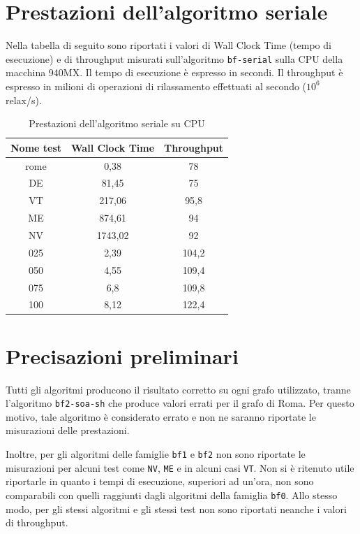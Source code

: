 \documentclass[12pt,a4paper]{book} %
\begin{document}
	\section{Prestazioni dell'algoritmo seriale}
	Nella tabella di seguito sono riportati i valori di Wall Clock Time (tempo di esecuzione) e di throughput misurati sull'algoritmo \texttt{bf-serial} sulla CPU della macchina 940MX. Il tempo di esecuzione è espresso in secondi. Il throughput è espresso in milioni di operazioni di rilassamento effettuati al secondo ($10^6$ relax/s).
	
	\begin{table}[!ht]
		\centering
		\begin{tabular}{|c|c|c|}
			\hline
			\textbf{Nome test} & \textbf{Wall Clock Time} & \textbf{Throughput} \\ \hline
			       rome & 0,38 & 78 \\ \hline
			        DE & 81,45 & 75 \\ \hline
			        VT & 217,06 & 95,8 \\ \hline
			        ME & 874,61 & 94 \\ \hline
			        NV & 1743,02 & 92 \\ \hline
			        025 & 2,39 & 104,2 \\ \hline
			        050 & 4,55 & 109,4 \\ \hline
			        075 & 6,8 & 109,8 \\ \hline
			        100 & 8,12 & 122,4 \\ \hline
		\end{tabular}
		\label{tab:performance_serial}
		\caption{Prestazioni dell'algoritmo seriale su CPU}
	\end{table}

	\section{Precisazioni preliminari}
	Tutti gli algoritmi producono il risultato corretto su ogni grafo utilizzato, tranne l'algoritmo \texttt{bf2-soa-sh} che produce valori errati per il grafo di Roma. Per questo motivo, tale algoritmo è considerato errato e non ne saranno riportate le misurazioni delle prestazioni.
	
	Inoltre, per gli algoritmi delle famiglie \texttt{bf1} e \texttt{bf2} non sono riportate le misurazioni per alcuni test come \texttt{NV}, \texttt{ME} e in alcuni casi \texttt{VT}. Non si è ritenuto utile riportarle in quanto i tempi di esecuzione, superiori ad un'ora, non sono comparabili con quelli raggiunti dagli algoritmi della famiglia \texttt{bf0}. Allo stesso modo, per gli stessi algoritmi e gli stessi test non sono riportati neanche i valori di throughput.
	
\end{document}
